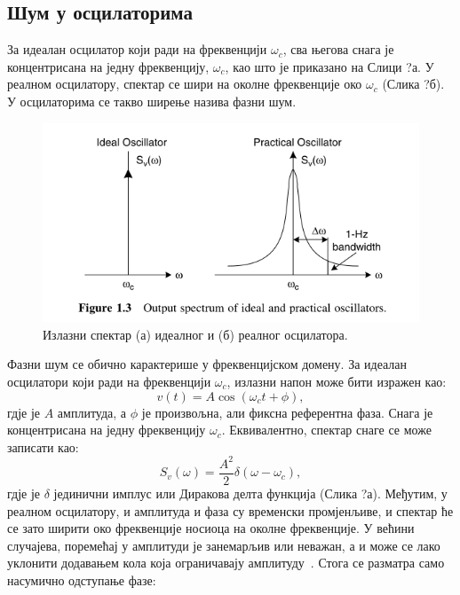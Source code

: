 \documentclass[master]{finthesis}
\begin{document}
\subsection{Шум у осцилаторима} \label{section:osc:noise}
За идеалан осцилатор који ради на фреквенцији $\omega_{c}$, сва његова снага је концентрисана на једну фреквенцију, $\omega_{c}$, као што је приказано на Слици ?а. У реалном осцилатору, спектар се шири на околне фреквенције око $\omega_{c}$ (Слика ?б). У осцилаторима се такво ширење назива фазни шум. \par
\begin{figure}[!ht]
	 \centering
	 \includegraphics[scale=0.6]{slike/osc_noise_1.png}
	 \caption{Излазни спектар (а) идеалног и (б) реалног осцилатора.}
	 \label{fig:osc:noise_1}
\end{figure}
Фазни шум се обично карактерише у фреквенцијском домену. За идеалан осцилатори који ради на фреквенцији $\omega_{c}$, излазни напон може бити изражен као:
\begin{equation}
	\label{eq:osc:noise:vt_1}
	v(t) = A\cos(\omega_{c}t + \phi),
\end{equation}
гдје је $A$ амплитуда, а $\phi$ је произвољна, али фиксна референтна фаза. Снага је концентрисана на једну фреквенцију $\omega_{c}$. Еквивалентно, спектар снаге се може записати као:
\begin{equation}
	\label{eq:osc:noise:sv_1}
	S_{v}(\omega) = \frac{A^{2}}{2}\delta (\omega - \omega_{c}),
\end{equation}
гдје је $\delta$ јединични имплус или Диракова делта функција (Слика ?а). Међутим, у реалном осцилатору, и амплитуда и фаза су временски промјенљиве, и спектар ће се зато ширити око фреквенције носиоца на околне фреквенције. У већини случајева, поремећај у амплитуди је занемарљив или неважан, а и може се лако уклонити додавањем кола која ограничавају амплитуду~\cite{Staszewski:FREQUENCY_SYNTHESIZER_CMOS_2005}. Стога се разматра само насумично одступање фазе:
\end{document}
